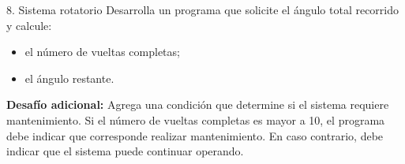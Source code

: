 \documentclass{beamer}
\begin{document}
    \begin{frame}{8. Sistema rotatorio}
        Desarrolla un programa que solicite el ángulo total recorrido y calcule:

        \begin{itemize}
            \item el número de vueltas completas;
            \item el ángulo restante.
        \end{itemize}

        \textbf{Desafío adicional:}  Agrega una condición que determine si el sistema requiere 
        mantenimiento. Si el número de vueltas completas es mayor a 10, el programa debe indicar 
        que corresponde realizar mantenimiento. En caso contrario, debe indicar que el sistema puede 
        continuar operando.
    \end{frame}
\end{document}
